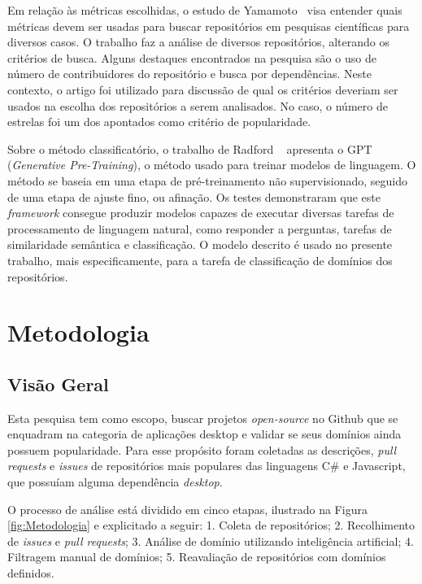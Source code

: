 \documentclass[12pt]{article}
\begin{document}
Em relação às métricas escolhidas, o estudo de Yamamoto~\cite{9282287} visa entender quais métricas devem ser usadas para buscar repositórios em pesquisas científicas para diversos casos. O trabalho faz a análise de diversos repositórios, alterando os critérios de busca. Alguns destaques encontrados na pesquisa são o uso de número de contribuidores do repositório e busca por dependências. Neste contexto, o artigo foi utilizado para discussão de qual os critérios deveriam ser usados na escolha dos repositórios a serem analisados. No caso, o número de estrelas foi um dos apontados como critério de popularidade.

Sobre o método classificatório, o trabalho de Radford ~\cite{radford2018improving} apresenta o GPT (\textit{Generative Pre-Training}), o método usado para treinar modelos de linguagem. O método se baseia em uma etapa de pré-treinamento não supervisionado, seguido de uma etapa de ajuste fino, ou afinação. Os testes demonstraram que este \textit{framework} consegue produzir modelos capazes de executar diversas tarefas de processamento de linguagem natural, como responder a perguntas, tarefas de similaridade semântica e classificação. O modelo descrito é usado no presente trabalho, mais especificamente, para a tarefa de classificação de domínios dos repositórios.

\section{Metodologia} \label{metodologia}

\subsection{Visão Geral}

Esta pesquisa tem como escopo, buscar projetos \textit{open-source} no Github que se enquadram na categoria de aplicações desktop e validar se seus domínios ainda possuem popularidade. Para esse propósito foram coletadas as descrições, \textit{pull requests} e \textit{issues} de repositórios mais populares das linguagens C\# e Javascript, que possuíam alguma dependência \textit{desktop}. 

O processo de análise está dividido em cinco etapas, ilustrado na Figura \ref{fig:Metodologia} e explicitado a seguir: 1. Coleta de repositórios; 2. Recolhimento de \textit{issues} e \textit{pull requests}; 3. Análise de domínio utilizando inteligência artificial; 4. Filtragem manual de domínios; 5. Reavaliação de repositórios com domínios definidos.
\end{document}
